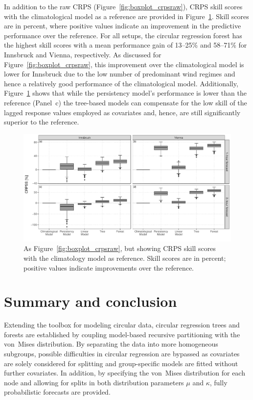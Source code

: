 \documentclass{statsoc}
\begin{document}
In addition to the raw CRPS (Figure~\ref{fig:boxplot_crpsraw}), CRPS skill
scores with the climatological model as a reference are provided in
Figure~\ref{fig:boxplot_crpsskill}. Skill scores are in percent, where positive
values indicate an improvement in the predictive performance over the
reference. For all setups, the circular regression forest has the highest skill
scores with a mean performance gain of 13--25\% and 58--71\% for Innsbruck and
Vienna, respectively. As discussed for Figure~\ref{fig:boxplot_crpsraw}, this
improvement over the climatological model is lower for Innsbruck due to the low
number of predominant wind regimes and hence a relatively good performance of
the climatological model. Additionally, Figure~\ref{fig:boxplot_crpsskill}
shows that while the persistency model's performance is lower than the
reference (Panel~c) the tree-based models can compensate for the low skill of
the lagged response values employed as covariates and, hence, are still
significantly superior to the reference.

\begin{figure}[t]
  \centering
  \includegraphics{_plot_circforest_validation_crpsskill_agg_comparison_with_lowff_v14b.pdf}
  \caption{As Figure~\ref{fig:boxplot_crpsraw}, but showing CRPS skill scores
    with the climatology model as reference. Skill scores are in percent; positive
    values indicate improvements over the reference.} 
  \label{fig:boxplot_crpsskill} 
\end{figure}

\section{Summary and conclusion}
\label{sec:summary}
Extending the toolbox for modeling circular data, circular regression trees and
forests are established by coupling model-based recursive partitioning with the
von~Mises distribution. By separating the data into more homogeneous subgroups,
possible difficulties in circular regression are bypassed as covariates are
solely considered for splitting and group-specific models are fitted without
further covariates. In addition, by specifying the von~Mises distribution for
each node and allowing for splits in both distribution parameters $\mu$ and
$\kappa$, fully probabilistic forecasts are provided.
\end{document}
